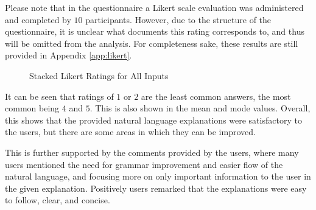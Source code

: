 \documentclass[sigconf,nonacm]{acmart}
\begin{document}
Please note that in the questionnaire a Likert scale evaluation was administered and completed by $10$ participants. However, due to the structure of the questionnaire, it is unclear what documents this rating corresponds to, and thus will be omitted from the analysis. For completeness sake, these results are still provided in Appendix \ref{app:likert}.



\begin{figure}[h]
    \centering
    \caption{Stacked Likert Ratings for All Inputs}
    \label{fig:likert_overall}
\end{figure}

It can be seen that ratings of $1$ or $2$ are the least common answers, the most common being $4$ and $5$. This is also shown in the mean and mode values. Overall, this shows that the provided natural language explanations were satisfactory to the users, but there are some areas in which they can be improved.

This is further supported by the comments provided by the users, where many users mentioned the need for grammar improvement and easier flow of the natural language, and focusing more on only important information to the user in the given explanation. Positively users remarked that the explanations were easy to follow, clear, and concise.
\end{document}
